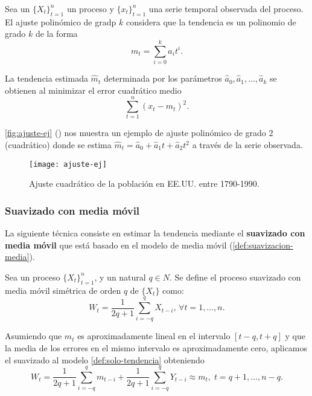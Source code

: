 \begin{definicion}
  Sea un $\{X_t\}_{t = 1}^n$ un proceso y $\{x_t\}_{t = 1}^n$ una serie temporal observada del proceso. El ajuste polinómico de gradp $k$ considera que la tendencia es un polinomio de grado $k$ de la forma
  $$m_t = \sum \limits^k_{i = 0} a_i t^i.$$

  La tendencia estimada $\hat{m}_t$ determinada por los parámetros $\hat{a}_0, \hat{a}_1, \ldots, \hat{a}_k$ se obtienen al minimizar el error cuadrático medio $$\sum \limits^n_{t = 1} (x_t - m_t)^2.$$
  \label{def:ajuste-polinomico}
\end{definicion}

\autoref{fig:ajuste-ej} (\cite{brockwell2002introduction}) nos muestra un ejemplo de ajuste polinómico de grado 2 (cuadrático) donde se estima $\hat{m}_t = \hat{a}_0 + \hat{a}_1 t + \hat{a}_2 t^2$ a través de la serie observada.

\begin{figure}[htpb]
  \centering
  \texttt{[image: ajuste-ej]}
  \caption{Ajuste cuadrático de la población en EE.UU. entre 1790-1990.}
  \label{fig:ajuste-ej}
\end{figure}

\subsubsection{Suavizado con media móvil}

La siguiente técnica consiste en estimar la tendencia mediante el \textbf{suavizado con media móvil} que está basado en el modelo de media móvil (\autoref{def:suavizacion-media}).

\begin{definicion}
  Sea un proceso $\{X_t\}_{t = 1}^n$, y un natural $q \in N$. Se define el proceso suavizado con media móvil simétrica de orden $q$ de $\{X_t\}$ como:
  $$ W_t = \dfrac{1}{2q + 1} \sum \limits^q_{i = -q} X_{t - i}, \, \forall t = 1, \ldots, n.$$
  \label{def:suavizacion-media}
\end{definicion}

Asumiendo que $m_t$ es aproximadamente lineal en el intervalo $[t - q, t + q]$ y que la media de los errores en el mismo intervalo es aproximadamente cero, aplicamos el suavizado al modelo \autoref{def:solo-tendencia} obteniendo
\begin{equation*}
  W_t = \dfrac{1}{2q + 1} \sum \limits^q_{i = -q} m_{t - i} + \dfrac{1}{2q + 1} \sum \limits^q_{i = -q} Y_{t - i} \approx m_t, \; t = q + 1, \ldots, n - q.
  \label{eq:suavizacion}
\end{equation*}

